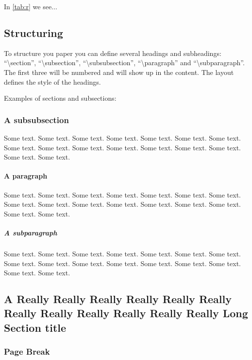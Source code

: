 \documentclass[numbered]{ivt-style/standard}\usepackage[]{graphicx}\usepackage[]{xcolor}
\begin{document}
In \cref{tab:r} we see...

\subsection{Structuring}

To structure you paper you can define several headings and
subheadings:
``\textbackslash{}section'', ``\textbackslash{}subsection'',
``\textbackslash{}subsubsection'', ``\textbackslash{}paragraph'' and
``\textbackslash{}subparagraph''. The first three will be numbered and
will show
up in the content. The layout defines the style of the headings.

Examples of sections and subsections:

\subsubsection{A subsubsection}

Some text. Some text. Some text. Some text. Some text. Some text. Some
text. Some text. Some text. Some text. Some text. Some text. Some
text. Some text. Some text. Some text.

\paragraph{A paragraph}

Some text. Some text. Some text. Some text. Some text. Some text. Some
text. Some text. Some text. Some text. Some text. Some text. Some
text. Some text. Some text. Some text.

\subparagraph{A subparagraph}

Some text. Some text. Some text. Some text. Some text. Some text. Some
text. Some text. Some text. Some text. Some text. Some text. Some
text. Some text. Some text. Some text.

\subsection{A Really Really Really Really Really Really Really Really Really Really Really Really Long Section title}
\subsubsection{Page Break}
\end{document}
